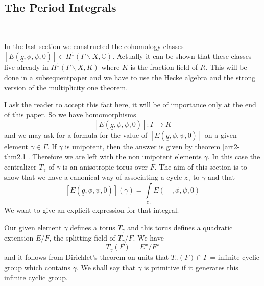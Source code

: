 \setcounter{section}{3}
\setcounter{subsection}{0}
\subsection{The Period Integrals}\label{art2-sec3.1}
~

In the last section we constructed the cohomology classes $[E(\underline{g},\phi,\psi,0)]\in H^{1}(\Gamma\backslash X,\mathbb{C})$. Actually it can be shown that these classes live already in $H^{1}(\Gamma\backslash X,K)$ where $K$ is the fraction field of $R$. This will be done in a subsequent\pageoriginale paper and we have to use the Hecke algebra and the strong version of the multiplicity one theorem.

I ask the reader to accept this fact here, it will be of importance only at the end of this paper. So we have homomorphisms
$$
[E(\underline{g},\phi,\psi,0)]:\Gamma\to K
$$
and we may ask for a formula for the value of $[E(\underline{g},\phi,\psi,0)]$ on a given element $\gamma\in \Gamma$. If $\gamma$ is unipotent, then the answer is given by theorem \ref{art2-thm2.1}. Therefore we are left with the non unipotent elements $\gamma$. In this case the centralizer $T_{\gamma}$ of $\gamma$ is an anisotropic torus over $F$. The aim of this section is to show that we have a canonical way of associating a cycle $z_{\gamma}$ to $\gamma$ and that
$$
[E(\underline{g},\phi,\psi,0)](\gamma)=\int\limits_{z_{\gamma}}E(\quad,\phi,\psi,0)
$$
We want to give an explicit expression for that integral.

Our given element $\gamma$ defines a torus $T_{\gamma}$ and this torus defines a quadratic extension $E/F$, the splitting field of $T_{\gamma}/F$. We have
$$
T_{\gamma}(F)=E^{x}/F^{x}
$$
and it follows from Dirichlet's theorem on units that $T_{\gamma}(F)\cap \Gamma$ = infinite cyclic group which contains $\gamma$. We shall say that $\gamma$ is primitive if it generates this infinite cyclic group.

